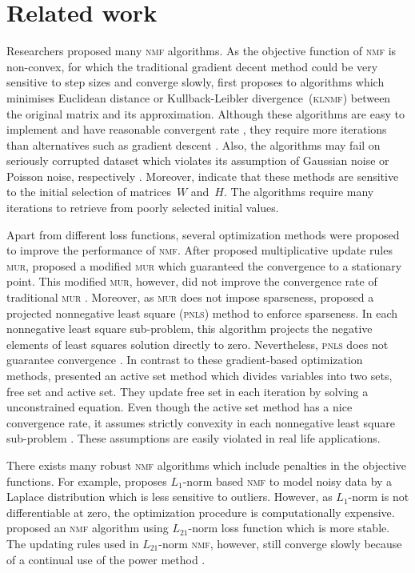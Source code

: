 \section{Related work}\label{chp3}
Researchers proposed many \textsc{nmf} algorithms. As the objective function of \textsc{nmf} is non-convex, for which the traditional gradient decent method could be very sensitive to step sizes and converge slowly, \citet{lee2001algorithms} first proposes to algorithms which minimises Euclidean distance or Kullback-Leibler divergence~(\textsc{klnmf}) between the original matrix and its approximation. Although these algorithms are easy to implement and have reasonable convergent rate \citep{lee2001algorithms}, they require more iterations than alternatives such as gradient descent \citep{berry2007algorithms}. Also, the algorithms may fail on seriously corrupted dataset which violates its assumption of Gaussian noise or Poisson noise, respectively \citep{guan2017truncated}. Moreover, \citet{yang2011kullback} indicate that these methods are sensitive to the initial selection of matrices~$W$ and~$H$. The algorithms require many iterations to retrieve from poorly selected initial values.

Apart from different loss functions, several optimization methods were proposed to improve the performance of \textsc{nmf}. After \citet{lee2001algorithms} proposed multiplicative update rules \textsc{mur}, \citet{ lin2007convergence} proposed a modified \textsc{mur} which guaranteed the convergence to a stationary point. This modified \textsc{mur}, however, did not improve the convergence rate of traditional \textsc{mur} \citep{guan2012nenmf}. Moreover, as \textsc{mur} does not impose sparseness, \citet{berry2007algorithms} proposed a projected nonnegative least square (\textsc{pnls}) method to enforce sparseness. In each nonnegative least square sub-problem, this algorithm projects the negative elements of least squares solution directly to zero. Nevertheless, \textsc{pnls} does not guarantee convergence \citep{guan2012nenmf}. In contrast to these gradient-based optimization methods, \citet{kim2008nonnegative} presented an active set method which divides variables into two sets, free set and active set. They update free set in each iteration by solving a unconstrained equation. Even though the active set method has a nice convergence rate, it assumes strictly convexity in each nonnegative least square sub-problem \citep{kim2008nonnegative}. These assumptions are easily violated in real life applications.

There exists many robust \textsc{nmf} algorithms which include penalties in the objective functions. For example, \citet{lam2008non} proposes ${L_1}$-norm based \textsc{nmf} to model noisy data by a Laplace distribution which is less sensitive to outliers. However, as $L_1$-norm is not differentiable at zero, the optimization procedure is computationally expensive. \citet{kong2011robust} proposed an \textsc{nmf} algorithm using $L_{21}$-norm loss function which is more stable. The updating rules used in $L_{21}$-norm \textsc{nmf}, however, still converge slowly because of a continual use of the power method \citep{guan2017truncated}.


